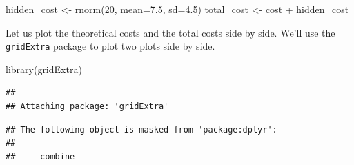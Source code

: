 \documentclass[
]{book}
\newenvironment{Shaded}{\begin{snugshade}}{\end{snugshade}}
\newcommand{\AttributeTok}[1]{\textcolor[rgb]{0.77,0.63,0.00}{#1}}
\newcommand{\DecValTok}[1]{\textcolor[rgb]{0.00,0.00,0.81}{#1}}
\newcommand{\FloatTok}[1]{\textcolor[rgb]{0.00,0.00,0.81}{#1}}
\newcommand{\FunctionTok}[1]{\textcolor[rgb]{0.00,0.00,0.00}{#1}}
\newcommand{\NormalTok}[1]{#1}
\newcommand{\OtherTok}[1]{\textcolor[rgb]{0.56,0.35,0.01}{#1}}
\newcommand{\SpecialCharTok}[1]{\textcolor[rgb]{0.00,0.00,0.00}{#1}}
\begin{document}
\begin{Shaded}
\begin{Highlighting}[]
\NormalTok{hidden\_cost }\OtherTok{\textless{}{-}} \FunctionTok{rnorm}\NormalTok{(}\DecValTok{20}\NormalTok{, }\AttributeTok{mean=}\FloatTok{7.5}\NormalTok{, }\AttributeTok{sd=}\FloatTok{4.5}\NormalTok{)}
\NormalTok{total\_cost }\OtherTok{\textless{}{-}}\NormalTok{ cost }\SpecialCharTok{+}\NormalTok{ hidden\_cost}
\end{Highlighting}
\end{Shaded}

Let us plot the theoretical costs and the total costs side by side. We'll use the \texttt{gridExtra} package to plot two plots side by side.

\begin{Shaded}
\begin{Highlighting}[]
\FunctionTok{library}\NormalTok{(gridExtra)}
\end{Highlighting}
\end{Shaded}

\begin{verbatim}
## 
## Attaching package: 'gridExtra'
\end{verbatim}

\begin{verbatim}
## The following object is masked from 'package:dplyr':
## 
##     combine
\end{verbatim}
\end{document}
